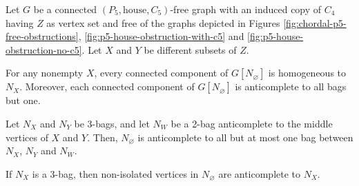 \begin{lemma}
    Let $G$ be a connected $(P_5,\text{house},C_5)$-free graph with an induced
    copy of $C_4$ having $Z$ as vertex set and free of the graphs depicted in
    Figures \ref{fig:chordal-p5-free-obstructions},
    \ref{fig:p5-house-obstruction-with-c5} and
    \ref{fig:p5-house-obstruction-no-c5}. Let $X$ and $Y$ be different subsets
    of $Z$.
    \begin{lemenum}
        \item For any nonempty $X$, every connected component of
            $G[N_\varnothing]$ is homogeneous to $N_X$. Moreover, each connected
            component of $G[N_\varnothing]$ is anticomplete to all bags but one.
            \label{lem:type_8}
        \item Let $N_X$ and $N_Y$ be 3-bags, and let $N_W$ be a 2-bag
            anticomplete to the middle vertices of $X$ and $Y$. Then,
            $N_\varnothing$ is anticomplete to all but at most one bag between
            $N_X$, $N_Y$ and $N_W$. \label{lem:type_9}
        \item If $N_X$ is a 3-bag, then non-isolated vertices in $N_\varnothing$
            are anticomplete to $N_X$. \label{lem:type_10}
    \end{lemenum}
\end{lemma}

